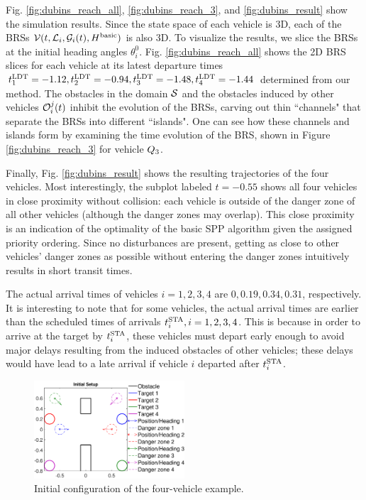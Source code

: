 Fig. \ref{fig:dubins_reach_all}, \ref{fig:dubins_reach_3}, and \ref{fig:dubins_result} show the simulation results. Since the state space of each vehicle is 3D, each of the BRSs $\mathcal{V}(t, \mathcal{L}_i, \mathcal{G}_i(t), H^\text{basic})$ is also 3D. To visualize the results, we slice the BRSs at the initial heading angles $\theta_i^0$. Fig. \ref{fig:dubins_reach_all} shows the 2D BRS slices for each vehicle at its latest departure times $t^\text{LDT}_1=-1.12, t^\text{LDT}_2=-0.94,t^\text{LDT}_3=-1.48,t^\text{LDT}_4=-1.44$ determined from our method. The obstacles in the domain $\mathcal{S}$ and the obstacles induced by other vehicles $\mathcal{O}_i^j(t)$ inhibit the evolution of the BRSs, carving out thin ``channels" that separate the BRSs into different ``islands". One can see how these channels and islands form by examining the time evolution of the BRS, shown in Figure \ref{fig:dubins_reach_3} for vehicle $Q_3$. 

Finally, Fig. \ref{fig:dubins_result} shows the resulting trajectories of the four vehicles. Most interestingly, the subplot labeled $t=-0.55$ shows all four vehicles in close proximity without collision: each vehicle is outside of the danger zone of all other vehicles (although the danger zones may overlap). This close proximity is an indication of the optimality of the basic SPP algorithm given the assigned priority ordering. Since no disturbances are present, getting as close to other vehicles' danger zones as possible without entering the danger zones intuitively results in short transit times.

The actual arrival times of vehicles $i=1,2,3,4$ are $0, 0.19, 0.34, 0.31$, respectively. It is interesting to note that for some vehicles, the actual arrival times are earlier than the scheduled times of arrivals $t^\text{STA}_i, i=1,2,3,4$. This is because in order to arrive at the target by $t^\text{STA}_i$, these vehicles must depart early enough to avoid major delays resulting from the induced obstacles of other vehicles; these delays would have lead to a late arrival if vehicle $i$ departed after $t^\text{STA}_i$.

\begin{figure}
	\centering
	\includegraphics[width=0.5\textwidth]{"fig/dubins_ic"}
	\caption{Initial configuration of the four-vehicle example.}
	\label{fig:dubins_ic}
\end{figure}

